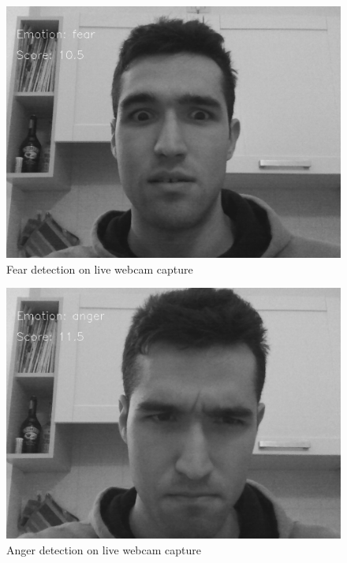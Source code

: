 \begin{figure}
  \centering
  \includegraphics{./images/db_fear.png}
  \caption{Fear detection on live webcam capture}
  \label{fig:exampl_fear}
\end{figure}

\begin{figure}
  \centering
  \includegraphics{./images/db_anger.png}
  \caption{Anger detection on live webcam capture}
  \label{fig:exampl_anger}
\end{figure}

